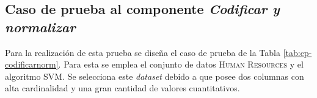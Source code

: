\subsection{Caso de prueba al componente \textit{Codificar y normalizar}}
Para la realización de esta prueba se diseña el caso de prueba de la Tabla \ref{tab:cp-codificarnorm}. Para esta se emplea el conjunto de datos \textsc{Human Resources} y el algoritmo SVM. Se selecciona este \textit{dataset} debido a que posee dos columnas con alta cardinalidad y una gran cantidad de valores cuantitativos.

\begin{table}[H]
	\centering
	\caption{Caso de prueba al componente \textit{Codificar y normalizar}}
	\label{tab:cp-codificarnorm}
	\begin{spacing}{1.15}
\end{spacing}
\end{table}
